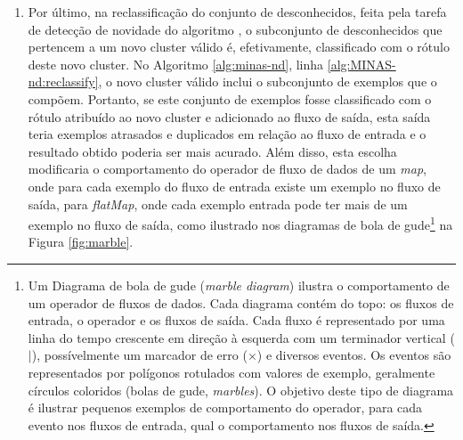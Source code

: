 \begin{enumerate}
  \item \label{reclassification}
  Por último, na reclassificação do conjunto de desconhecidos,
  feita pela tarefa de detecção de novidade do algoritmo \minas, o subconjunto de
  desconhecidos que pertencem a um novo cluster válido é, efetivamente,
  classificado com o rótulo deste novo cluster.
  No Algoritmo \ref{alg:minas-nd}, linha \ref{alg:MINAS-nd:reclassify},
  o novo cluster válido inclui o subconjunto de exemplos que o compõem.
  Portanto, se este conjunto de exemplos fosse classificado com o rótulo atribuído ao
  novo cluster e adicionado ao fluxo de saída, esta saída teria exemplos
  atrasados e duplicados em relação ao fluxo de entrada e o resultado obtido
  poderia ser mais acurado.
  Além disso, esta escolha modificaria o comportamento do operador de fluxo de
  dados de um \emph{map}, onde para cada exemplo do fluxo de entrada existe um
  exemplo no fluxo de saída, para \emph{flatMap}, onde cada exemplo entrada pode
  ter mais de um exemplo no fluxo de saída, como ilustrado nos 
  diagramas de bola de gude\footnote{
  Um Diagrama de bola de gude (\emph{marble diagram}) ilustra o comportamento de
  um operador de fluxos de dados.
  Cada diagrama contém do topo: os fluxos de entrada, o operador e os fluxos de saída.
  Cada fluxo é representado por uma linha do tempo crescente em direção à
  esquerda com um terminador vertical ($|$), possívelmente um marcador de erro
  ($\times$) e diversos eventos.
  Os eventos são representados por polígonos rotulados com valores de exemplo,
  geralmente círculos coloridos (bolas de gude, \emph{marbles}).
  O objetivo deste tipo de diagrama é ilustrar pequenos exemplos de comportamento
  do operador, para cada evento nos fluxos de entrada, qual o comportamento nos
  fluxos de saída.
  }
  na Figura \ref{fig:marble}.

\end{enumerate}

